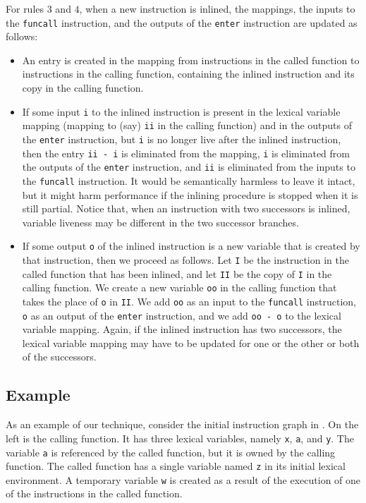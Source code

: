 For rules $3$ and $4$, when a new instruction is inlined, the mappings,
the inputs to the \texttt{funcall} instruction, and the outputs of the
\texttt{enter} instruction are updated as follows:

\begin{itemize}
\item An entry is created in the mapping from instructions in the
  called function to instructions in the calling function, containing
  the inlined instruction and its copy in the calling function.
\item If some input \texttt{i} to the inlined instruction is present
  in the lexical variable mapping (mapping to (say) \texttt{ii} in the
  calling function) and in the outputs of the \texttt{enter}
  instruction, but \texttt{i} is no longer live after the inlined
  instruction, then the entry \texttt{ii - i} is eliminated from the
  mapping, \texttt{i} is eliminated from the outputs of the
  \texttt{enter} instruction, and \texttt{ii} is eliminated from the
  inputs to the \texttt{funcall} instruction.  It would be
  semantically harmless to leave it intact, but it might harm
  performance if the inlining procedure is stopped when it is still
  partial.  Notice that, when an instruction with two successors is
  inlined, variable liveness may be different in the two successor
  branches.
\item If some output \texttt{o} of the inlined instruction is a new
  variable that is created by that instruction, then we proceed as
  follows.  Let \texttt{I} be the instruction in the called function
  that has been inlined, and let \texttt{II} be the copy of \texttt{I}
  in the calling function.  We create a new variable \texttt{oo} in
  the calling function that takes the place of \texttt{o} in
  \texttt{II}.  We add \texttt{oo} as an input to the \texttt{funcall}
  instruction, \texttt{o} as an output of the \texttt{enter}
  instruction, and we add \texttt{oo - o} to the lexical variable
  mapping.  Again, if the inlined instruction has two successors, the
  lexical variable mapping may have to be updated for one or the other
  or both of the successors.
\end{itemize}

\subsection{Example}

As an example of our technique, consider the initial instruction graph
in .  On the left is the calling function.  It has three
lexical variables, namely \texttt{x}, \texttt{a}, and \texttt{y}.  The
variable \texttt{a} is referenced by the called function, but it is
owned by the calling function.  The called function has a single
variable named \texttt{z} in its initial lexical environment.  A
temporary variable \texttt{w} is created as a result of the execution
of one of the instructions in the called function.

